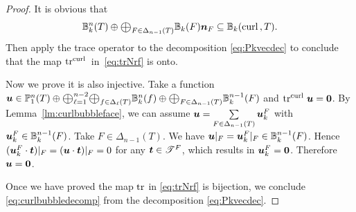 \documentclass[mathpazo]{cicp}
\newcommand{\Oplus}{\ensuremath{\vcenter{\hbox{\scalebox{1.5}{$\oplus$}}}}}
\begin{document}
\begin{proof}
It is obvious that
$$
\mathbb B_k^n(T) \oplus \Oplus_{F\in \Delta_{n-1}(T)} \mathbb B_k(F)\bs n_F \subseteq \mathbb B_{k}(\curl,T).
$$
Then apply the trace operator to the decomposition \eqref{eq:Pkvecdec}
 to conclude that 
the map $\operatorname{tr}^{{\rm curl\,}}$ in~\eqref{eq:trNrf} is onto. 

Now we prove it is also injective. Take a function $\bs u\in  \mathbb P_1^n(T)\oplus \Oplus_{\ell = 1}^{n-2}\Oplus_{f\in \Delta_{\ell}(T)} \mathbb B_k^n(f)\oplus \Oplus_{F\in \Delta_{n-1}(T)}  \mathbb B_k^{n-1}(F)$ and $\operatorname{tr}^{{\rm curl\,}} \boldsymbol u =\boldsymbol 0$. By Lemma~\ref{lm:curlbubbleface}, we can assume $\boldsymbol u=\sum\limits_{F\in \Delta_{n-1}(T)}\boldsymbol u_k^F$ with $\boldsymbol u_k^F \in \mathbb B_k^{n-1}(F)$.
Take $F\in \Delta_{n-1}(T)$. We have $\boldsymbol u|_F=\boldsymbol u_k^F|_F\in \mathbb B_k^{n-1}(F)$. Hence $(\boldsymbol u_k^F\cdot\boldsymbol t)|_F=(\boldsymbol u\cdot\boldsymbol t)|_F=0$ for any $\boldsymbol t\in\mathscr T^F$, which results in $\boldsymbol u_k^F=\boldsymbol0$. Therefore $\boldsymbol u = \boldsymbol0$.  


Once we have proved the map $\operatorname{tr}$ in \eqref{eq:trNrf} is bijection, we conclude \eqref{eq:curlbubbledecomp} from the decomposition \eqref{eq:Pkvecdec}. 
\end{proof}
\end{document}
